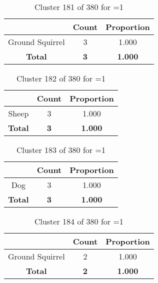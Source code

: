 \begin{table}[ht!]
\centering
\begin{tabular}{|c|c|c|}
\hline
\bf \Spec{} &\bf Count &\bf Proportion\\ \hline \hline
Ground Squirrel & 3 & 1.000\\ \hline
\hline
\bf Total & \bf 3 & \bf 1.000\\ \hline
\end{tabular}
\label{tab:cluster:181:1}
\caption{Cluster 181 of 380 for \minneigh{}=1}
\end{table}

\begin{table}[ht!]
\centering
\begin{tabular}{|c|c|c|}
\hline
\bf \Spec{} &\bf Count &\bf Proportion\\ \hline \hline
Sheep & 3 & 1.000\\ \hline
\hline
\bf Total & \bf 3 & \bf 1.000\\ \hline
\end{tabular}
\label{tab:cluster:182:1}
\caption{Cluster 182 of 380 for \minneigh{}=1}
\end{table}

\begin{table}[ht!]
\centering
\begin{tabular}{|c|c|c|}
\hline
\bf \Spec{} &\bf Count &\bf Proportion\\ \hline \hline
Dog & 3 & 1.000\\ \hline
\hline
\bf Total & \bf 3 & \bf 1.000\\ \hline
\end{tabular}
\label{tab:cluster:183:1}
\caption{Cluster 183 of 380 for \minneigh{}=1}
\end{table}

\begin{table}[ht!]
\centering
\begin{tabular}{|c|c|c|}
\hline
\bf \Spec{} &\bf Count &\bf Proportion\\ \hline \hline
Ground Squirrel & 2 & 1.000\\ \hline
\hline
\bf Total & \bf 2 & \bf 1.000\\ \hline
\end{tabular}
\label{tab:cluster:184:1}
\caption{Cluster 184 of 380 for \minneigh{}=1}
\end{table}

